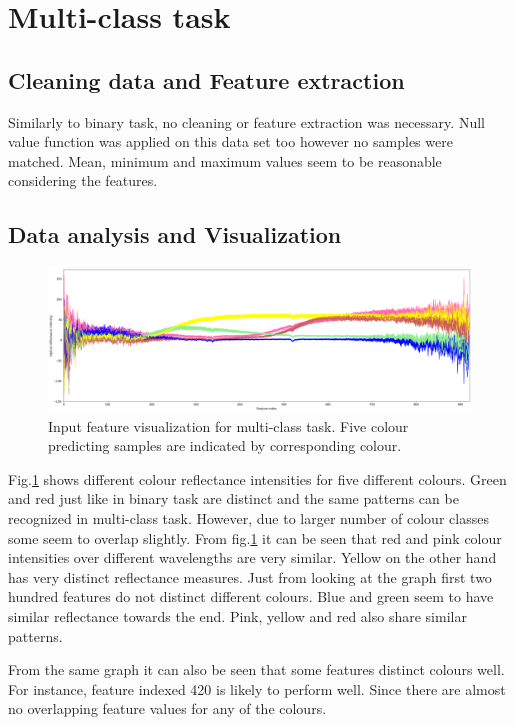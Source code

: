 \documentclass[11pt]{article}
\begin{document}
			\clearpage
	\section{Multi-class task}
		\subsection{Cleaning data and Feature extraction}
			Similarly to binary task, no cleaning or feature extraction was necessary. Null value function was applied on this data set too however no samples were matched. Mean, minimum and maximum values seem to be reasonable considering the features. 

		\subsection{Data analysis and Visualization}

			\begin{figure}[H]
				\includegraphics[width=1\textwidth]{png/multi_default}
				\caption{Input feature visualization for multi-class task. Five colour predicting samples are indicated by corresponding colour.}
				\label{fig:multi}
			\end{figure}

			Fig.\ref{fig:multi} shows different colour reflectance intensities for five different colours. Green and red just like in binary task are distinct and the same patterns can be recognized in multi-class task. However, due to larger number of colour classes some seem to overlap slightly. From fig.\ref{fig:multi} it can be seen that red and pink colour intensities over different wavelengths are very similar. Yellow on the other hand has very distinct reflectance measures. Just from looking at the graph first two hundred features do not distinct different colours. Blue and green seem to have similar reflectance towards the end. Pink, yellow and red also share similar patterns. 

			From the same graph it can also be seen that some features distinct colours well. For instance, feature indexed 420 is likely to perform well. Since there are almost no overlapping feature values for any of the colours. 
\end{document}
